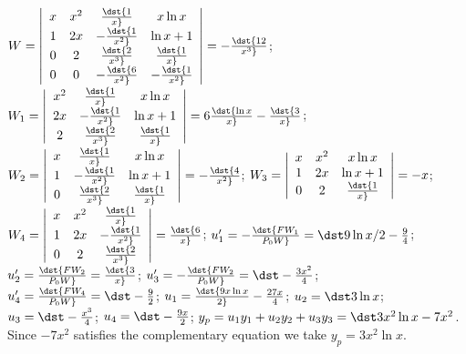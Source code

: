 \documentclass[dvips]{book}
\renewcommand{\exer}[1]{\par\medskip\;\noindent{\color{red}\bf #1.}}
\numberwithin{example}{section}
\numberwithin{equation}{section}
\numberwithin{theorem}{section}
\numberwithin{table}{section}
\numberwithin{figure}{section}
\begin{document}
\exer{9.4.30}
$W=\left|\begin{array}{cccc}
x&x^2&\dst{1\over x}&x\ln x\\1&2x&-\dst{1\over x^2}&\ln x+1\\
0&2&\dst{2\over x^3}&\dst{1\over x}\\0&0&-\dst{6\over x^2}&-\dst{1\over x^2}
\end{array}\right|=-\dst{12\over x^3}$;
$W_1=\left|\begin{array}{cccc}
x^2&\dst{1\over x}&x\ln x\\2x&-\dst{1\over x^2}&\ln x+1\\
2&\dst{2\over x^3}&\dst{1\over x}\end{array}\right|=6\dst{\ln
x\over x}-\dst{3\over x}$;
$W_2=\left|\begin{array}{cccc}
x&\dst{1\over x}&x\ln x\\1&-\dst{1\over x^2}&\ln x+1\\
0&\dst{2\over x^3}&\dst{1\over x}\end{array}\right|=-\dst{4\over
x^2}$;
$W_3=\left|\begin{array}{cccc}x&x^2&x\ln x\\
1&2x&\ln x+1\\0&2&\dst{1\over x}\end{array}\right|=-x$;
$W_4=\left|\begin{array}{cccc}
x&x^2&\dst{1\over x}\\1&2x&-\dst{1\over x^2}\\0&2&\dst{2\over x^3}
\end{array}\right|=\dst{6\over x}$;
$u_1'=-\dst{FW_1\over P_0W}=\dst9\ln x/2-{9\over 4}$;
$u_2'=\dst{FW_2\over P_0W}=\dst{3\over x}$;
$u_3'=-\dst{FW_2\over P_0W}=\dst-{3x^2\over 4}$;
$u_4'=\dst{FW_4\over P_0W}=\dst-{9\over 2}$;
$u_1=\dst{9x\ln x\over 2}-{27x\over 4}$;
$u_2=\dst3\ln x$;
$u_3=\dst-{x^3\over 4}$;
$u_4=\dst-{9x\over 2}$;
$y_p=u_1y_1+u_2y_2+u_3y_3=\dst3x^2\ln x-7x^2$.
Since $-7x^2$ satisfies the complementary equation we take
$y_p=3x^2\ln x$.
\end{document}
